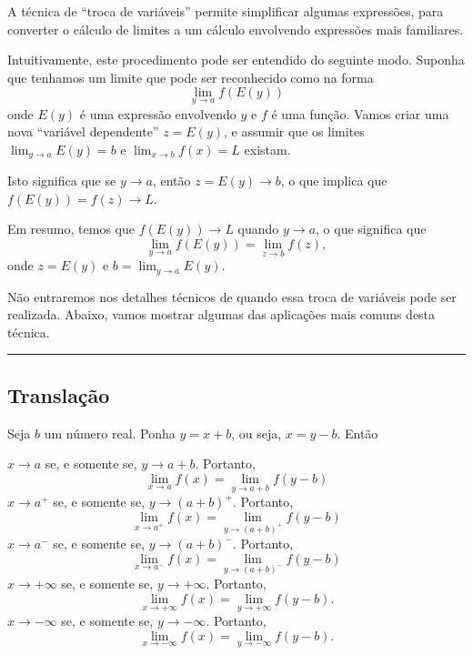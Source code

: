 A técnica de ``troca de variáveis'' permite simplificar algumas expressões, para converter o cálculo de limites a um cálculo envolvendo expressões mais familiares.

Intuitivamente, este procedimento pode ser entendido do seguinte modo. Suponha que tenhamos um limite que pode ser reconhecido como na forma
\[\lim_{y\to a}f(E(y))\]
onde $E(y)$ é uma expressão envolvendo $y$ e $f$ é uma função. Vamos criar uma nova ``variável dependente'' $z=E(y)$, e assumir que os limites $\lim_{y\to a}E(y)=b$ e $\lim_{x\to b}f(x)=L$ existam.

Isto significa que se $y\to a$, então $z=E(y)\to b$, o que implica que $f(E(y))=f(z)\to L$.

Em resumo, temos que $f(E(y))\to L$ quando $y\to  a$, o que significa que
\[\lim_{y\to a}f(E(y))=\lim_{z\to b}f(z),\]
onde $z=E(y)$ e $b=\lim_{y\to a}E(y)$.

Não entraremos nos detalhes técnicos de quando essa troca de variáveis pode ser realizada. Abaixo, vamos mostrar algumas das aplicações mais comuns desta técnica.

\hrule

\subsection*{Translação}

Seja $b$ um número real.  Ponha $y=x+b$, ou seja, $x=y-b$. Então

$x\to a$ se, e somente se, $y\to a+b$. Portanto,
\begin{equation*}\lim_{x\to a}f(x)=\lim_{y\to a+b}f(y-b)\end{equation*}
$x\to a^+$ se, e somente se, $y\to (a+b)^+$. Portanto,
\begin{equation*}\lim_{x\to a^+}f(x)=\lim_{y\to (a+b)^+}f(y-b)\end{equation*}
$x\to a^-$ se, e somente se, $y\to (a+b)^-$. Portanto,
\begin{equation*}\lim_{x\to a^-}f(x)=\lim_{y\to (a+b)^-}f(y-b)\end{equation*}
$x\to+\infty$ se, e somente se, $y\to+\infty$. Portanto,
\begin{equation*}\lim_{x\to+\infty}f(x)=\lim_{y\to+\infty}f(y-b).\end{equation*}
$x\to-\infty$ se, e somente se, $y\to-\infty$. Portanto,
\begin{equation*}\lim_{x\to-\infty} f(x)=\lim_{y\to -\infty}f(y-b).\end{equation*}

